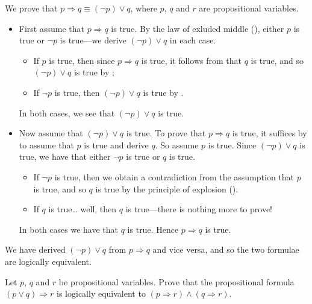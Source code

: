 \begin{example}
\label{exImplicationInTermsOfDisjunction}
We prove that $p \Rightarrow q \equiv (\neg p) \vee q$, where $p$, $q$ and $r$ are propositional variables.

\begin{itemize}
\item First assume that $p \Rightarrow q$ is true. By the law of exluded middle (), either $p$ is true or $\neg p$ is true---we derive $(\neg p) \vee q$ in each case.
\begin{itemize}
\item If $p$ is true, then since $p \Rightarrow q$ is true, it follows from \elimrule{\Rightarrow} that $q$ is true, and so $(\neg p) \vee q$ is true by ;
\item If $\neg p$ is true, then $(\neg p) \vee q$ is true by .
\end{itemize}
In both cases, we see that $(\neg p) \vee q$ is true.

\item Now assume that $(\neg p) \vee q$ is true. To prove that $p \Rightarrow q$ is true, it suffices by \introrule{\Rightarrow} to assume that $p$ is true and derive $q$. So assume $p$ is true. Since $(\neg p) \vee q$ is true, we have that either $\neg p$ is true or $q$ is true.
\begin{itemize}
\item If $\neg p$ is true, then we obtain a contradiction from the assumption that $p$ is true, and so $q$ is true by the principle of explosion ().
\item If $q$ is true\dots{} well, then $q$ is true---there is nothing more to prove!
\end{itemize}
In both cases we have that $q$ is true. Hence $p \Rightarrow q$ is true.
\end{itemize}

We have derived $(\neg p) \vee q$ from $p \Rightarrow q$ and vice versa, and so the two formulae are logically equivalent.
\end{example}

\begin{exercise}
\label{exPAndQImpliesRIffPImpliesRAndQImpliesR}
Let $p$, $q$ and $r$ be propositional variables. Prove that the propositional formula $(p \vee q) \Rightarrow r$ is logically equivalent to $(p \Rightarrow r) \wedge (q \Rightarrow r)$.
\end{exercise}

